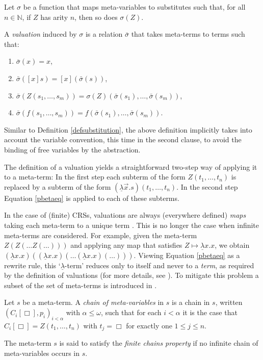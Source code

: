 \documentclass{LMCS}
\theoremstyle{plain}
\theoremstyle{definition}
\newcommand{\ulam}{\underline{\lambda}}
\begin{document}
\begin{defi}
\label{defvaluation}
Let $\sigma$ be a function that maps meta-variables to substitutes
such that, for all $n \in \mathbb{N}$, if $Z$ has arity $n$, then so
does $\sigma(Z)$.

A \emph{valuation} induced by $\sigma$ is a relation $\bar{\sigma}$ that takes meta-terms to terms such that:
\begin{enumerate}[(1)]
\item
$\bar{\sigma}(x) = x$,
\item
$\bar{\sigma}([x]s) = [x](\bar{\sigma}(s))$,
\item
$\bar{\sigma}(Z(s_1, \ldots, s_m)) = \sigma(Z)(\bar{\sigma}(s_1), \ldots, \bar{\sigma}(s_m))$,
\item
$\bar{\sigma}(f(s_1, \ldots, s_m)) = f(\bar{\sigma}(s_1), \ldots, \bar{\sigma}(s_m))$.
\end{enumerate}

\end{defi}

Similar to Definition \ref{defsubstitution}, the above definition implicitly takes into account the variable convention, this time in the second clause, to avoid the binding of free variables by the abstraction.

The definition of a valuation yields a straightforward two-step way of applying it to a meta-term: In the first step each subterm of the form $Z(t_1, \ldots, t_n)$ is replaced by a subterm of the form $(\ulam \vec{x}. s)(t_1, \ldots, t_n)$. In the second step Equation \eqref{pbetaeq} is applied to each of these subterms.

In the case of (finite) CRSs, valuations are always (everywhere defined) \emph{maps} taking each meta-term to a unique term \cite[Remark II.1.10.1]{K80}. This is no longer the case when infinite meta-terms are considered. For example, given the meta-term $Z(Z(\ldots Z(\ldots)))$ and applying any map that satisfies $Z \mapsto \ulam x.x$, we obtain $(\ulam x. x)((\ulam x. x)(\ldots (\ulam x. x)(\ldots)))$. Viewing Equation \eqref{pbetaeq} as a rewrite rule, this `$\ulam$-term' reduces only to itself and never to a \emph{term}, as required by the definition of valuations (for more details, see \cite{JJ05a}). To mitigate this problem a subset of the set of meta-terms is introduced in \cite{JJ05a}.
\begin{defi}
Let $s$ be a meta-term.  A \emph{chain of meta-variables} in $s$ is a chain in $s$, written $(C_i[\Box],p_i)_{i < \alpha}$ with $\alpha \leq \omega$, such that for each $i < \alpha$ it is the case that $C_i[\Box] = Z(t_1, \ldots, t_n)$ with $t_j = \Box$ for exactly one $1 \leq j \leq n$.

The meta-term $s$ is said to satisfy the \emph{finite chains property} if no infinite chain of meta-variables occurs in $s$.
\end{defi}
\end{document}

